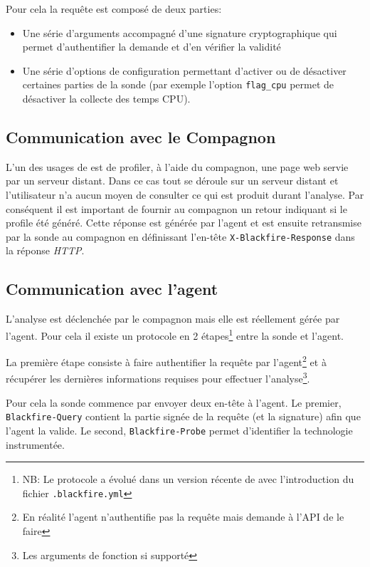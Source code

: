 Pour cela la requête est composé de deux parties:
\begin{itemize}
\item Une série d'arguments accompagné d'une signature cryptographique qui permet d'authentifier la demande et d'en vérifier la validité
\item Une série d'options de configuration permettant d'activer ou de désactiver certaines parties de la sonde (par exemple l'option \verb|flag_cpu| permet de désactiver la collecte des temps CPU).
\end{itemize}

			\subsection{Communication avec le Compagnon}
			\label{subsec:comm-compagnon}
L'un des usages de \Blackfire est de profiler, à l'aide du compagnon, une page web servie par un serveur distant. Dans ce cas tout se déroule sur un serveur distant et l'utilisateur n'a aucun moyen de consulter ce qui est produit durant l'analyse. Par conséquent il est important de fournir au compagnon un retour indiquant si le profile été généré. Cette réponse est générée par l'agent et est ensuite retransmise par la sonde au compagnon en définissant l'en-tête \verb|X-Blackfire-Response| dans la réponse \emph{HTTP}.

			\subsection{Communication avec l'agent}
			\label{subsec:comm-agent}
L'analyse est déclenchée par le compagnon mais elle est réellement gérée par l'agent. Pour cela il existe un protocole en 2 étapes\footnote{NB: Le protocole a évolué dans un version récente de \Blackfire avec l'introduction du fichier \verb|.blackfire.yml|} entre la sonde et l'agent.

La première étape consiste à faire authentifier la requête par l'agent\footnote{En réalité l'agent n'authentifie pas la requête mais demande à l'API de le faire} et à récupérer les dernières informations requises pour effectuer l'analyse\footnote{Les arguments de fonction si supporté}.

Pour cela la sonde commence par envoyer deux en-tête à l'agent. Le premier, \verb|Blackfire-Query| contient la partie signée de la requête (et la signature) afin que l'agent la valide. Le second, \verb|Blackfire-Probe| permet d'identifier la technologie instrumentée.

